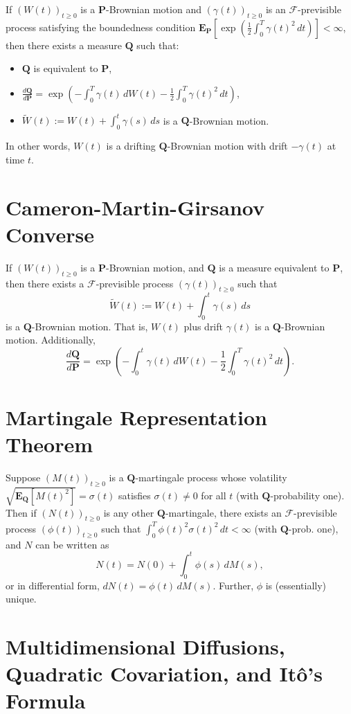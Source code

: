 \documentclass[twocolumn]{amsart}
\renewcommand{\P}{\mathbf{P}}
\newcommand{\Q}{\mathbf{Q}}
\newcommand{\EP}{\mathbf{E}_\mathbf{P}}
\newcommand{\EQ}{\mathbf{E}_\mathbf{Q}}
\newcommand{\F}{\mathcal{F}}
\newcommand{\tW}{\widetilde W}
\begin{document}
If $(W(t))_{t \ge 0}$ is a $\P$-Brownian motion and $(\gamma(t))_{t \ge 0}$ is an $\F$-previsible process satisfying the boundedness condition $\EP\left[\exp\left(\frac{1}{2} \int_0^T\gamma(t)^2\,dt\right)\right] < \infty$, then there exists a measure $\Q$ such that:
\begin{itemize}
    \item $\Q$ is equivalent to $\P$,
    \item $\displaystyle \frac{d \Q}{d \P} = \exp\left(- \int_0^T \gamma(t)\,dW(t) - \frac{1}{2} \int_0^T \gamma(t)^2\,dt \right)$,
    \item $\tW(t) := W(t) + \int_0^t \gamma(s)\,ds$ is a $\Q$-Brownian motion.
\end{itemize}
In other words, $W(t)$ is a drifting $\Q$-Brownian motion with drift $-\gamma(t)$ at time $t$.

\section*{Cameron-Martin-Girsanov Converse}

If $(W(t))_{t \ge 0}$ is a $\P$-Brownian motion, and $\Q$ is a measure equivalent to $\P$, then there exists a $\F$-previsible process $(\gamma(t))_{t \ge 0}$ such that
\[ \tW(t) := W(t) + \int_0^t \gamma(s)\,ds \]
is a $\Q$-Brownian motion. That is, $W(t)$ plus drift $\gamma(t)$ is a $\Q$-Brownian motion. Additionally,
\[ \frac{d \Q}{d \P} = \exp\left(-\int_0^t \gamma(t)\,dW(t) - \frac{1}{2} \int_0^T \gamma(t)^2\,dt\right).\]

\section*{Martingale Representation Theorem}

Suppose $(M(t))_{t \ge 0}$ is a $\Q$-martingale process whose volatility $\sqrt{\EQ[M(t)^2]} = \sigma(t)$ satisfies $\sigma(t) \ne 0$ for all $t$ (with $\Q$-probability one). Then if $(N(t))_{t \ge 0}$ is any other $\Q$-martingale, there exists an $\F$-previsible process $(\phi(t))_{t \ge 0}$ such that $\int_0^T \phi(t)^2 \sigma(t)^2\,dt < \infty$ (with $\Q$-prob. one), and $N$ can be written as
\[ N(t) = N(0) + \int_0^t \phi(s)\,dM(s), \]
or in differential form, $dN(t) = \phi(t)\,dM(s)$. Further, $\phi$ is (essentially) unique.

\section*{Multidimensional Diffusions, Quadratic Covariation, and It\^o's Formula}
\end{document}
